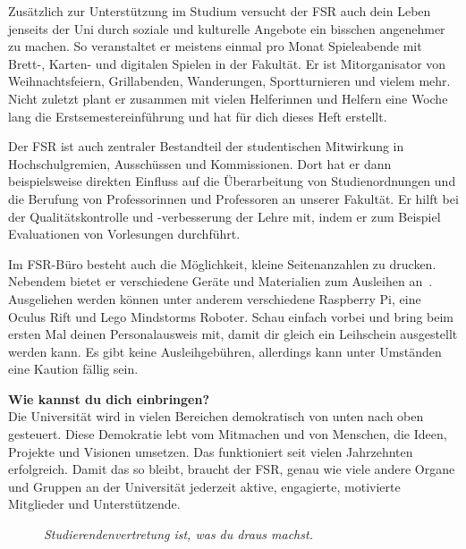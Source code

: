 Zusätzlich zur Unterstützung im Studium versucht der FSR auch dein Leben jenseits der Uni durch soziale und kulturelle Angebote ein bisschen angenehmer zu machen.
So veranstaltet er meistens einmal pro Monat Spieleabende mit Brett-, Karten- und digitalen Spielen in der Fakultät.
Er ist Mitorganisator von Weihnachtsfeiern, Grillabenden, Wanderungen, Sportturnieren und vielem mehr.
Nicht zuletzt plant er zusammen mit vielen Helferinnen und Helfern eine Woche lang die Erstsemestereinführung und hat für dich dieses Heft erstellt.

Der FSR ist auch zentraler Bestandteil der studentischen Mitwirkung in Hochschulgremien, Ausschüssen und Kommissionen.
Dort hat er dann beispielsweise direkten Einfluss auf die Überarbeitung von Studienordnungen und die Berufung von Professorinnen und Professoren an unserer Fakultät.
Er hilft bei der Qualitätskontrolle und -verbesserung der Lehre mit, indem er zum Beispiel Evaluationen von Vorlesungen durchführt.

Im FSR-Büro besteht auch die Möglichkeit, kleine Seitenanzahlen zu drucken.
Nebendem bietet er verschiedene Geräte und Materialien zum Ausleihen an~.
Ausgeliehen werden können unter anderem verschiedene Raspberry Pi, eine Oculus Rift und Lego Mindstorms Roboter.
Schau einfach vorbei und bring beim ersten Mal deinen Personalausweis mit, damit dir gleich ein Leihschein ausgestellt werden kann.
Es gibt keine Ausleihgebühren, allerdings kann unter Umständen eine Kaution fällig sein.


\textbf{Wie kannst du dich einbringen?} \\
Die Universität wird in vielen Bereichen demokratisch von unten nach oben gesteuert. Diese Demokratie lebt vom Mitmachen und von Menschen, die Ideen, Projekte und Visionen umsetzen.
Das funktioniert seit vielen Jahrzehnten erfolgreich.
Damit das so bleibt, braucht der FSR, genau wie viele andere Organe und Gruppen an der Universität jederzeit aktive, engagierte, motivierte Mitglieder und Unterstützende.

\begin{figure}[h!]
\centering
\textit{Studierendenvertretung ist, was du draus machst.}
\end{figure}

